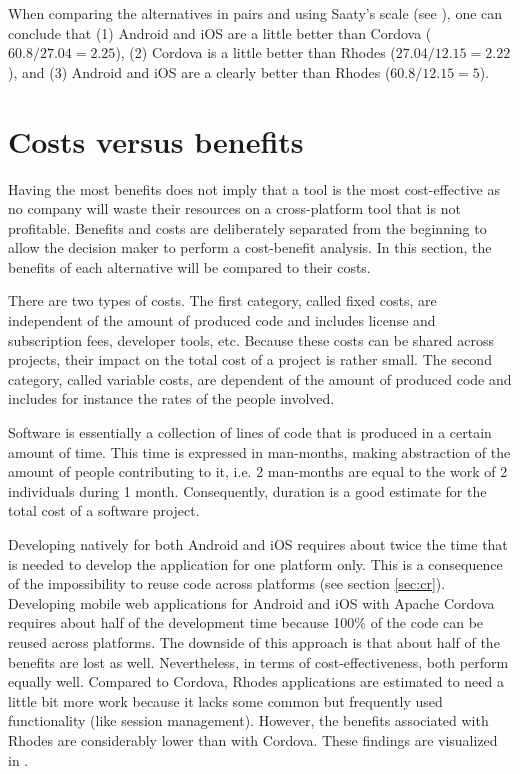 When comparing the alternatives in pairs and using Saaty's scale (see ), one can conclude that (1) Android and iOS are a little better than Cordova ($60.8/27.04 = 2.25$), (2) Cordova is a little better than Rhodes ($27.04 / 12.15 = 2.22$), and (3) Android and iOS are a clearly better than Rhodes ($60.8 / 12.15 = 5$).

\section{Costs versus benefits}
\label{sec:ev:costben}

Having the most benefits does not imply that a tool is the most cost-effective as no company will waste their resources on a cross-platform tool that is not profitable. Benefits and costs are deliberately separated from the beginning to allow the decision maker to perform a cost-benefit analysis. In this section, the benefits of each alternative will be compared to their costs.

There are two types of costs. The first category, called fixed costs, are independent of the amount of produced code and includes license and subscription fees, developer tools, etc. Because these costs can be shared across projects, their impact on the total cost of a project is rather small. The second category, called variable costs, are dependent of the amount of produced code and includes for instance the rates of the people involved.

Software is essentially a collection of lines of code that is produced in a certain amount of time. This time is expressed in man-months, making abstraction of the amount of people contributing to it, i.e. 2 man-months are equal to the work of 2 individuals during 1 month. Consequently, duration is a good estimate for the total cost of a software project.

Developing natively for both Android and iOS requires about twice the time that is needed to develop the application for one platform only. This is a consequence of the impossibility to reuse code across platforms (see section \ref{sec:cr}). Developing mobile web applications for Android and iOS with Apache Cordova requires about half of the development time because 100\% of the code can be reused across platforms. The downside of this approach is that about half of the benefits are lost as well. Nevertheless, in terms of cost-effectiveness, both perform equally well. Compared to Cordova, Rhodes applications are estimated to need a little bit more work because it lacks some common but frequently used functionality (like session management). However, the benefits associated with Rhodes are considerably lower than with Cordova. These findings are visualized in .

